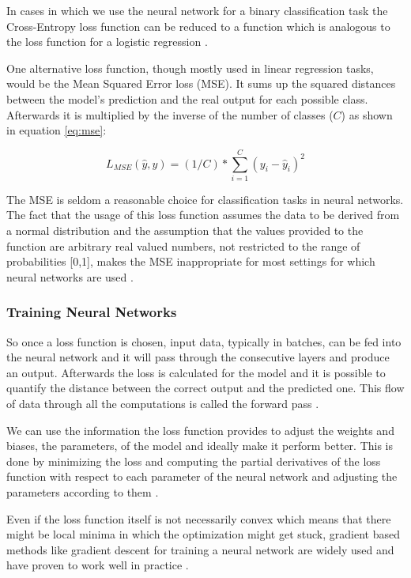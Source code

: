 In cases in which we use the neural network for a binary classification task the Cross-Entropy loss function can be reduced to a function which is analogous to the loss function for a logistic regression \citep{jurafsky2021}.

One alternative loss function, though mostly used in linear regression tasks, would be the Mean Squared Error loss (MSE). It sums up the squared distances between the model's prediction and the real output for each possible class. Afterwards it is multiplied by the inverse of the number of classes ($C$) as shown in equation \ref{eq:mse}:

\begin{equation}
\label{eq:mse}
    L_{MSE}(\hat{y},y) = (1/C) * \sum_{i=1}^{C} (y_i - \hat{y}_i)^2
\end{equation}

The MSE is seldom a reasonable choice for classification tasks in neural networks. The fact that the usage of this loss function assumes the data to be derived from a normal distribution and the assumption that the values provided to the function are arbitrary real valued numbers, not restricted to the range of probabilities [0,1], makes the MSE inappropriate for most settings for which neural networks are used \citep{khan2019mse}.




\subsubsection{Training Neural Networks}
\label{nn_train}
So once a loss function is chosen, input data, typically in batches, can be fed into the neural network and it will pass through the consecutive layers and produce an output. 
Afterwards the loss is calculated for the model and it is possible to quantify the distance between the correct output and the predicted one. 
This flow of data through all the computations is called the forward pass \citep{goldberg2017neural}.

We can use the information the loss function provides to adjust the weights and biases, the parameters, of the model and ideally make it perform better. 
This is done by minimizing the loss and computing the partial derivatives of the loss function with respect to each parameter of the neural network and adjusting the parameters according to them \citep{Goodfellow-et-al-2016}.

Even if the loss function itself is not necessarily convex which means that there might be local minima in which the optimization might get stuck, gradient based methods like gradient descent for training a neural network are widely used and have proven to work well in practice \citep{goldberg2017neural}.

